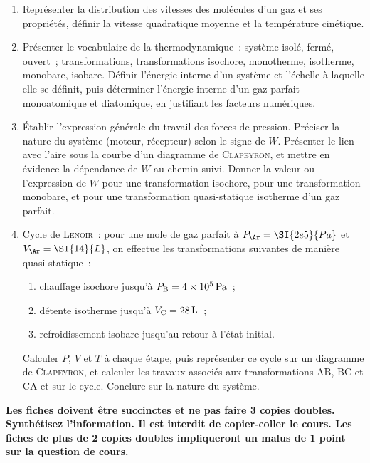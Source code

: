 \documentclass[a4paper, 10pt, final, garamond]{book}
\begin{document}
\begin{enumerate}[label=\sqenumi]
    \item Représenter la distribution des vitesses des molécules d'un gaz et ses
      propriétés, définir la vitesse quadratique moyenne et la température
      cinétique.

    \item Présenter le vocabulaire de la thermodynamique~: système isolé, fermé,
      ouvert~; transformations, transformations isochore, monotherme, isotherme,
      monobare, isobare. Définir l'énergie interne d'un système et l'échelle à
      laquelle elle se définit, puis déterminer l'énergie interne d'un gaz
      parfait monoatomique et diatomique, en justifiant les facteurs numériques.

    \item Établir l'expression générale du travail des forces de pression.
      Préciser la nature du système (moteur, récepteur) selon le signe de $W$.
      Présenter le lien avec l'aire sous la courbe d'un diagramme de
      \textsc{Clapeyron}, et mettre en évidence la dépendance de $W$ au chemin
      suivi. Donner la valeur ou l'expression de $W$ pour une transformation
      isochore, pour une transformation monobare, et pour une transformation
      quasi-statique isotherme d'un gaz parfait.

    \item Cycle de \textsc{Lenoir}~: pour une mole de gaz parfait à $P_\Ar =
      \SI{2e5}{Pa}$ et $V_\Ar = \SI{14}{L}$, on effectue les transformations
      suivantes de manière quasi-statique~:
      \begin{enumerate}[label=\alph*)]
        \item chauffage isochore jusqu'à $P_{\rm B} = \SI{4e5}{Pa}$~;
        \item détente isotherme jusqu'à $V_{\rm C} = \SI{28}{L}$~;
        \item refroidissement isobare jusqu'au retour à l'état initial.
      \end{enumerate}
      Calculer $P$, $V$ et $T$ à chaque étape, puis représenter ce cycle sur un
      diagramme de \textsc{Clapeyron}, et calculer les travaux associés aux
      transformations AB, BC et CA et sur le cycle. Conclure sur la nature du
      système.
\end{enumerate}
\vspace{-5pt}

\begin{framed}
    \centering\bfseries\large
    Les fiches doivent être \ul{succinctes} et ne pas faire 3 copies doubles.
    Synthétisez l'information. Il est interdit de copier-coller le cours.
    \bigbreak \Huge
    Les fiches de plus de 2 copies doubles impliqueront un malus de 1 point sur
    la question de cours.
\end{framed}
\end{document}
